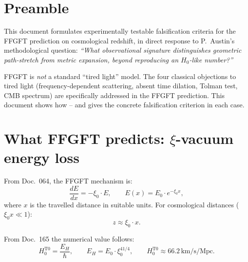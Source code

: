 
\section*{Preamble}

This document formulates experimentally testable falsification criteria
for the FFGFT prediction on cosmological redshift, in direct response
to P.~Austin's methodological question:
\emph{\enquote{What observational signature distinguishes geometric
path-stretch from metric expansion, beyond reproducing an $H_0$-like
number?}}

FFGFT is \emph{not} a standard \enquote{tired light} model. The four
classical objections to tired light (frequency-dependent scattering,
absent time dilation, Tolman test, CMB spectrum) are specifically
addressed in the FFGFT prediction. This document shows how -- and gives
the concrete falsification criterion in each case.

\section{\texorpdfstring{What FFGFT predicts: $\xi$-vacuum energy loss}{What FFGFT predicts: xi-vacuum energy loss}}

From Doc.~064, the FFGFT mechanism is:
\begin{equation}
  \frac{dE}{dx} = -\xi_0 \cdot E,
  \qquad
  E(x) = E_0 \cdot e^{-\xi_0 x},
  \label{eq:energy-loss}
\end{equation}
where $x$ is the travelled distance in suitable units. For
cosmological distances ($\xi_0 x \ll 1$):
\begin{equation}
  z \approx \xi_0 \cdot x.
\end{equation}

From Doc.~165 the numerical value follows:
\begin{equation}
  H_0^{\text{T0}}
  = \frac{E_H}{\hbar},
  \qquad
  E_H = E_0 \cdot \xi_0^{41/4},
  \qquad
  H_0^{\text{T0}} \approx 66.2\,\text{km/s/Mpc}.
\end{equation}

